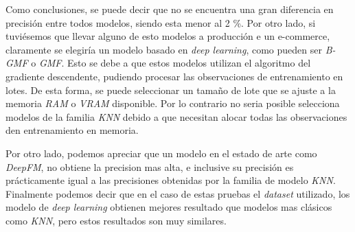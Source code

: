 \documentclass[11pt,a4paper,twoside]{thesis}
\begin{document}
Como conclusiones, se puede decir que no se encuentra una gran diferencia en precisión entre todos modelos, siendo esta menor al 2 \%. Por otro lado, si tuviésemos que llevar alguno de esto modelos a producción e un e-commerce, claramente se elegiría un modelo basado en \textit{deep learning}, como pueden ser \textit{B-GMF} o \textit{GMF}. Esto se debe a que estos modelos utilizan el algoritmo del gradiente descendente, pudiendo procesar las observaciones de entrenamiento en lotes. De esta forma, se puede seleccionar un tamaño de lote que se ajuste a la memoria \textit{RAM} o \textit{VRAM} disponible. Por lo contrario no seria posible selecciona modelos de la familia \textit{KNN} debido a que necesitan alocar todas las observaciones den entrenamiento en memoria.

Por otro lado, podemos apreciar que un modelo en el estado de arte como \textit{DeepFM}, no obtiene la precision mas alta, e inclusive su precisión es prácticamente igual a las precisiones obtenidas por la familia de modelo \textit{KNN}.
Finalmente podemos decir que en el caso de estas pruebas el \textit{dataset} utilizado, los modelo de \textit{deep learning} obtienen mejores resultado que modelos mas clásicos como \textit{KNN}, pero estos resultados son muy similares.


\backmatter
%
\end{document}
